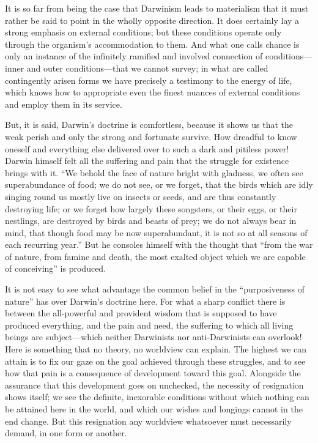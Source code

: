 \documentclass[12pt,a4paper]{article}
\begin{document}
It is so far from being the case that Darwinism leads to materialism
that it must rather be said to point in the wholly opposite direction.
It does certainly lay a strong emphasis on external conditions; but
these conditions operate only through the organism's accommodation to
them. And what one calls chance is only an instance of the infinitely
ramified and involved connection of conditions---inner and outer
conditions---that we cannot survey; in what are called contingently
arisen forms we have precisely a testimony to the energy of life,
which knows how to appropriate even the finest nuances of external
conditions and employ them in its service.

But, it is said, Darwin's doctrine is comfortless, because it shows
us that the weak perish and only the strong and fortunate survive. How
dreadful to know oneself and everything else delivered over to such a
dark and pitiless power! Darwin himself felt all the suffering and
pain that the struggle for existence brings with it. ``We behold the
face of nature bright with gladness, we often see superabundance of
food; we do not see, or we forget, that the birds which are idly
singing round us mostly live on insects or seeds, and are thus
constantly destroying life; or we forget how largely these songsters,
or their eggs, or their nestlings, are destroyed by birds and beasts
of prey; we do not always bear in mind, that though food may be now
superabundant, it is not so at all seasons of each recurring year.''
But he consoles himself with the thought that ``from the war of
nature, from famine and death, the most exalted object which we are
capable of conceiving'' is produced.

It is not easy to see what advantage the common belief in the
``purposiveness of nature'' has over Darwin's doctrine here. For what
a sharp conflict there is between the all-powerful and provident wisdom
that is supposed to have produced everything, and the pain and need,
the suffering to which all living beings are subject---which neither
Darwinists nor anti-Darwinists can overlook! Here is something that
no theory, no worldview can explain. The highest we can attain is to
fix our gaze on the goal achieved through these struggles, and to see
how that pain is a consequence of development toward this goal.
Alongside the assurance that this development goes on unchecked, the
necessity of resignation shows itself; we see the definite,
inexorable conditions without which nothing can be attained here in
the world, and which our wishes and longings cannot in the end change.
But this resignation any worldview whatsoever must necessarily demand,
in one form or another.
\end{document}
